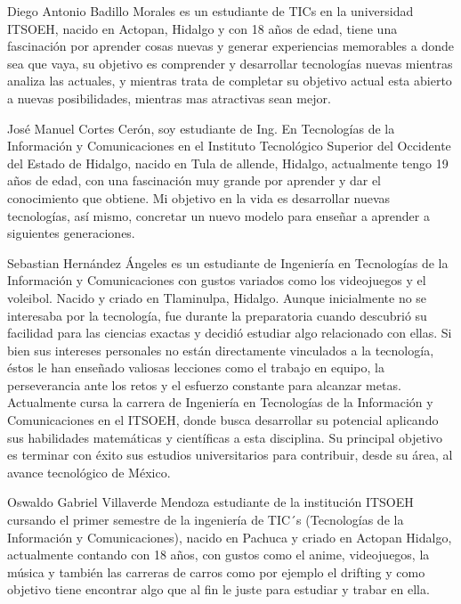 \documentclass{IEEEcsmag}
\begin{document}
Diego Antonio Badillo Morales es un estudiante de TICs en la  universidad ITSOEH, nacido en Actopan, Hidalgo y con 18 años de edad, tiene una fascinación por aprender cosas nuevas y generar experiencias memorables a donde sea que vaya, su objetivo es comprender y desarrollar tecnologías nuevas mientras analiza las actuales, y mientras trata de completar su objetivo actual esta abierto a nuevas posibilidades, mientras mas atractivas sean mejor.\newline\newline\newline

José Manuel Cortes Cerón, soy estudiante de Ing. En Tecnologías de la Información y Comunicaciones en el Instituto Tecnológico Superior del Occidente del Estado de Hidalgo, nacido en Tula de allende, Hidalgo, actualmente tengo 19 años de edad, con una fascinación muy grande por aprender y dar el conocimiento que obtiene. Mi objetivo en la vida es desarrollar nuevas tecnologías, así mismo, concretar un nuevo modelo para enseñar a aprender a siguientes generaciones.

Sebastian Hernández Ángeles es un estudiante de Ingeniería en Tecnologías de la Información y Comunicaciones con gustos variados como los videojuegos y el voleibol. Nacido y criado en Tlaminulpa, Hidalgo. Aunque inicialmente no se interesaba por la tecnología, fue durante la preparatoria cuando descubrió su facilidad para las  ciencias exactas y decidió estudiar algo relacionado con ellas. Si bien sus intereses personales no están directamente vinculados a la tecnología, éstos le han enseñado valiosas lecciones como el trabajo en equipo, la perseverancia ante los retos y el esfuerzo constante para alcanzar metas. Actualmente cursa la carrera de Ingeniería en Tecnologías de la Información y Comunicaciones en el ITSOEH, donde busca desarrollar su potencial aplicando sus habilidades matemáticas y científicas a esta disciplina. Su principal objetivo es terminar con éxito sus estudios universitarios para contribuir, desde su área, al avance tecnológico de México. \newline\newline\newline


Oswaldo Gabriel Villaverde Mendoza estudiante de la institución ITSOEH cursando el primer semestre de la ingeniería de TIC´s (Tecnologías de la Información y Comunicaciones), nacido en Pachuca y criado en Actopan Hidalgo, actualmente contando con 18 años, con gustos como el anime, videojuegos, la música y también las carreras de carros como por ejemplo el drifting y como objetivo tiene encontrar algo que al fin le juste para estudiar y trabar en ella.\newline\newline\newline
  
\end{document}
